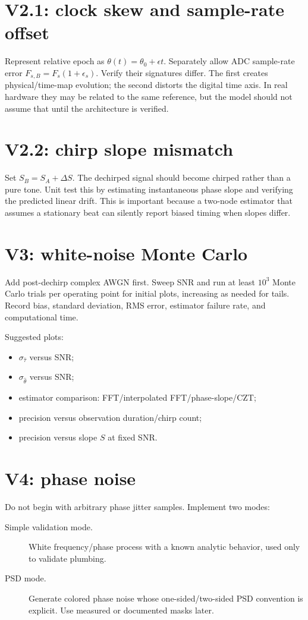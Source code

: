 \documentclass[11pt]{article}
\begin{document}
\section{V2.1: clock skew and sample-rate offset}
Represent relative epoch as $\theta(t)=\theta_0+\epsilon t$. Separately allow ADC sample-rate error $F_{s,B}=F_s(1+\epsilon_s)$. Verify their signatures differ. The first creates physical/time-map evolution; the second distorts the digital time axis. In real hardware they may be related to the same reference, but the model should not assume that until the architecture is verified.

\section{V2.2: chirp slope mismatch}
Set $S_B=S_A+\Delta S$. The dechirped signal should become chirped rather than a pure tone. Unit test this by estimating instantaneous phase slope and verifying the predicted linear drift. This is important because a two-node estimator that assumes a stationary beat can silently report biased timing when slopes differ.

\section{V3: white-noise Monte Carlo}
Add post-dechirp complex AWGN first. Sweep SNR and run at least $10^3$ Monte Carlo trials per operating point for initial plots, increasing as needed for tails. Record bias, standard deviation, RMS error, estimator failure rate, and computational time.

Suggested plots:
\begin{itemize}
\item $\sigma_{\hat\tau}$ versus SNR;
\item $\sigma_{\hat\theta}$ versus SNR;
\item estimator comparison: FFT/interpolated FFT/phase-slope/CZT;
\item precision versus observation duration/chirp count;
\item precision versus slope $S$ at fixed SNR.
\end{itemize}

\section{V4: phase noise}
Do not begin with arbitrary phase jitter samples. Implement two modes:
\begin{description}
\item[Simple validation mode.] White frequency/phase process with a known analytic behavior, used only to validate plumbing.
\item[PSD mode.] Generate colored phase noise whose one-sided/two-sided PSD convention is explicit. Use measured or documented masks later.
\end{description}
\end{document}
